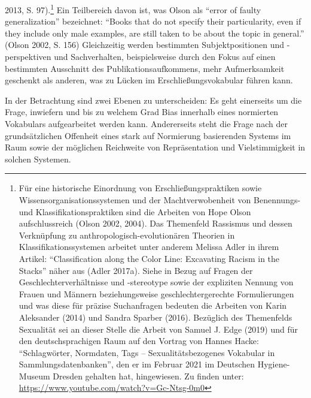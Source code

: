 \documentclass[a4paper,
fontsize=11pt,
oneside,
numbers=noperiodatend,
parskip=half-,
bibliography=totoc,
final
]{scrartcl}
\begin{document}
2013, S. 97).\footnote{Für eine historische Einordnung von
  Erschließungspraktiken sowie Wissensorganisationssystemen und der
  Machtverwobenheit von Benennungs- und Klassifikationspraktiken sind
  die Arbeiten von Hope Olson aufschlussreich (Olson 2002, 2004). Das
  Themenfeld Rassismus und dessen Verknüpfung zu
  anthropologisch-evolutionären Theorien in Klassifikationssystemen
  arbeitet unter anderem Melissa Adler in ihrem Artikel:
  \enquote{Classification along the Color Line: Excavating Racism in the
  Stacks} näher aus (Adler 2017a). Siehe in Bezug auf Fragen der
  Geschlechterverhältnisse und -stereotype sowie der expliziten Nennung
  von Frauen und Männern beziehungsweise geschlechtergerechte
  Formulierungen und was diese für präzise Suchanfragen bedeuten die
  Arbeiten von Karin Aleksander (2014) und Sandra Sparber (2016).
  Bezüglich des Themenfelds Sexualität sei an dieser Stelle die Arbeit
  von Samuel J. Edge (2019) und für den deutschsprachigen Raum auf den
  Vortrag von Hannes Hacke: \enquote{Schlagwörter, Normdaten, Tags --
  Sexualitätsbezogenes Vokabular in Sammlungsdatenbanken}, den er im
  Februar 2021 im Deutschen Hygiene-Museum Dresden gehalten hat,
  hingewiesen. Zu finden unter:
  \url{https://www.youtube.com/watch?v=Gc-Ntsg-0m0}} Ein Teilbereich
davon ist, was Olson als \enquote{error of faulty generalization}
bezeichnet: \enquote{Books that do not specify their particularity, even
if they include only male examples, are still taken to be about the
topic in general.} (Olson 2002, S. 156) Gleichzeitig werden bestimmten
Subjektpositionen und -perspektiven und Sachverhalten, beispielsweise
durch den Fokus auf einen bestimmten Ausschnitt des
Publikationsaufkommens, mehr Aufmerksamkeit geschenkt als anderen, was
zu Lücken im Erschließungsvokabular führen kann.

In der Betrachtung sind zwei Ebenen zu unterscheiden: Es geht einerseits
um die Frage, inwiefern und bis zu welchem Grad Bias innerhalb eines
normierten Vokabulars aufgearbeitet werden kann. Andererseits steht die
Frage nach der grundsätzlichen Offenheit eines stark auf Normierung
basierenden Systems im Raum sowie der möglichen Reichweite von
Repräsentation und Vielstimmigkeit in solchen Systemen.
\end{document}
